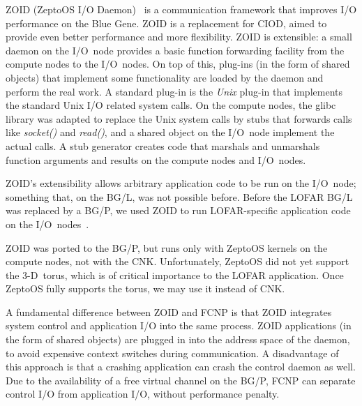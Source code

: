 \documentclass[journal]{IEEEtran}
\begin{document}
ZOID (ZeptoOS I/O Daemon)~\cite{Iskra:08} is a communication framework that
improves I/O performance on the Blue Gene.
ZOID is a replacement for CIOD, aimed to provide even better performance and
more flexibility.
ZOID is extensible: a small daemon on the I/O~node provides a basic function
forwarding facility from the compute nodes to the I/O~nodes.
On top of this, plug-ins (in the form of shared objects) that implement some
functionality are loaded by the daemon and perform the real work.
A standard plug-in is the \emph{Unix\/} plug-in that implements the standard
Unix I/O related system calls.
On the compute nodes, the glibc library was adapted to replace the Unix
system calls by stubs that forwards calls like \emph{socket()\/} and
\emph{read()}, and a shared object on the I/O~node implement the actual calls.
A stub generator creates code that marshals and unmarshals function
arguments and results on the compute nodes and I/O~nodes.

ZOID's extensibility allows arbitrary application code to be run on the
I/O~node; something that, on the BG/L, was not possible before.
Before the LOFAR BG/L was replaced by a BG/P, we used ZOID to run LOFAR-specific
application code on the I/O~nodes~\cite{Iskra:08}.


ZOID was ported to the BG/P, but runs only with ZeptoOS kernels on the
compute nodes, not with the CNK.
Unfortunately, ZeptoOS did not yet support the 3-D~torus, which is of critical
importance to the LOFAR application.
Once ZeptoOS fully supports the torus, we may use it instead of CNK.

A fundamental difference between ZOID and FCNP is that ZOID integrates system
control and application I/O into the same process.
ZOID applications (in the form of shared objects) are plugged in into the
address space of the daemon, to avoid expensive context switches during
communication.
A disadvantage of this approach is that a crashing application can crash
the control daemon as well.
Due to the availability of a free virtual channel on the BG/P,
FCNP can separate control I/O from application I/O, without performance penalty.
\end{document}
